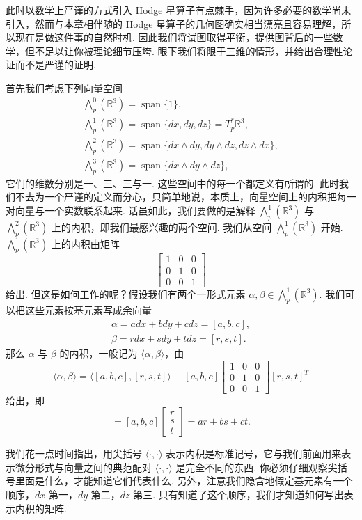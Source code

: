 此时以数学上严谨的方式引入 Hodge 星算子有点棘手，因为许多必要的数学尚未引入，然而与本章相伴随的 Hodge 星算子的几何图确实相当漂亮且容易理解，所以现在是做这件事的自然时机. 因此我们将试图取得平衡，提供图背后的一些数学，但不足以让你被理论细节压垮. 眼下我们将限于三维的情形，并给出合理性论证而不是严谨的证明.

首先我们考虑下列向量空间
\begin{align*}
\bigwedge_p^0(\mathbb{R}^3)=\operatorname{span}\{1\}, \\
\bigwedge_p^1(\mathbb{R}^3)=\operatorname{span}\{dx,dy,dz\}=T_p^*\mathbb{R}^3, \\
\bigwedge_p^2(\mathbb{R}^3)=\operatorname{span}\{dx\wedge dy,dy\wedge dz,dz\wedge dx\}, \\
\bigwedge_p^3(\mathbb{R}^3)=\operatorname{span}\{dx\wedge dy\wedge dz\},
\end{align*}
它们的维数分别是一、三、三与一. 这些空间中的每一个都定义有所谓的. 此时我们不去为一个严谨的定义而分心，只简单地说，本质上，向量空间上的内积把每一对向量与一个实数联系起来. 话虽如此，我们要做的是解释 $\bigwedge_p^1(\mathbb{R}^3)$ 与 $\bigwedge_p^2(\mathbb{R}^3)$ 上的内积，即我们最感兴趣的两个空间. 我们从空间 $\bigwedge_p^1(\mathbb{R}^3)$ 开始. $\bigwedge_p^1(\mathbb{R}^3)$ 上的内积由矩阵
\[
\begin{bmatrix}
1 & 0 & 0\\
0 & 1 & 0\\
0 & 0 & 1
\end{bmatrix}
\]
给出. 但这是如何工作的呢？假设我们有两个一形式元素 $\alpha,\beta\in\bigwedge_p^1(\mathbb{R}^3)$. 我们可以把这些元素按基元素写成余向量
\begin{align*}
\alpha=adx+bdy+cdz=[a,b,c], \\
\beta=rdx+sdy+tdz=[r,s,t].
\end{align*}
那么 $\alpha$ 与 $\beta$ 的内积，一般记为 $\langle\alpha,\beta\rangle$，由
\[
\langle\alpha,\beta\rangle=\langle[a,b,c],[r,s,t]\rangle
\equiv[a,b,c]
\begin{bmatrix}
1 & 0 & 0\\
0 & 1 & 0\\
0 & 0 & 1
\end{bmatrix}
[r,s,t]^T
\]
给出，即
\[
=[a,b,c]\begin{bmatrix}r\\s\\t\end{bmatrix}
=ar+bs+ct.
\]

我们花一点时间指出，用尖括号 $\langle\cdot,\cdot\rangle$ 表示内积是标准记号，它与我们前面用来表示微分形式与向量之间的典范配对 $\langle\cdot,\cdot\rangle$ 是完全不同的东西. 你必须仔细观察尖括号里面是什么，才能知道它们代表什么. 另外，注意我们隐含地假定基元素有一个顺序，$dx$ 第一，$dy$ 第二，$dz$ 第三. 只有知道了这个顺序，我们才知道如何写出表示内积的矩阵.

